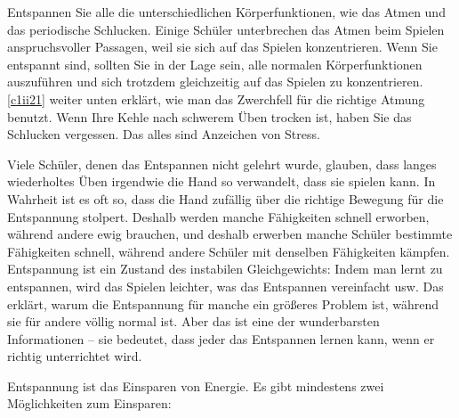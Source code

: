 Entspannen Sie alle die unterschiedlichen Körperfunktionen, wie das Atmen und das periodische Schlucken.
Einige Schüler unterbrechen das Atmen beim Spielen anspruchsvoller Passagen, weil sie sich auf das Spielen konzentrieren.
Wenn Sie entspannt sind, sollten Sie in der Lage sein, alle normalen Körperfunktionen auszuführen und sich trotzdem gleichzeitig auf das Spielen zu konzentrieren.
\hyperref[c1ii21]{\autoref{c1ii21}} weiter unten erklärt, wie man das Zwerchfell für die richtige Atmung benutzt.
Wenn Ihre Kehle nach schwerem Üben trocken ist, haben Sie das Schlucken vergessen.
Das alles sind Anzeichen von Stress.

Viele Schüler, denen das Entspannen nicht gelehrt wurde, glauben, dass langes wiederholtes Üben irgendwie die Hand so verwandelt, dass sie spielen kann.
In Wahrheit ist es oft so, dass die Hand zufällig über die richtige Bewegung für die Entspannung stolpert.
Deshalb werden manche Fähigkeiten schnell erworben, während andere ewig brauchen, und deshalb erwerben manche Schüler bestimmte Fähigkeiten schnell, während andere Schüler mit denselben Fähigkeiten kämpfen.
Entspannung ist ein Zustand des instabilen Gleichgewichts: Indem man lernt zu entspannen, wird das Spielen leichter, was das Entspannen vereinfacht usw.
Das erklärt, warum die Entspannung für manche ein größeres Problem ist, während sie für andere völlig normal ist.
Aber das ist eine der wunderbarsten Informationen -- sie bedeutet, dass jeder das Entspannen lernen kann, wenn er richtig unterrichtet wird.

Entspannung ist das Einsparen von Energie.
Es gibt mindestens zwei Möglichkeiten zum Einsparen:

